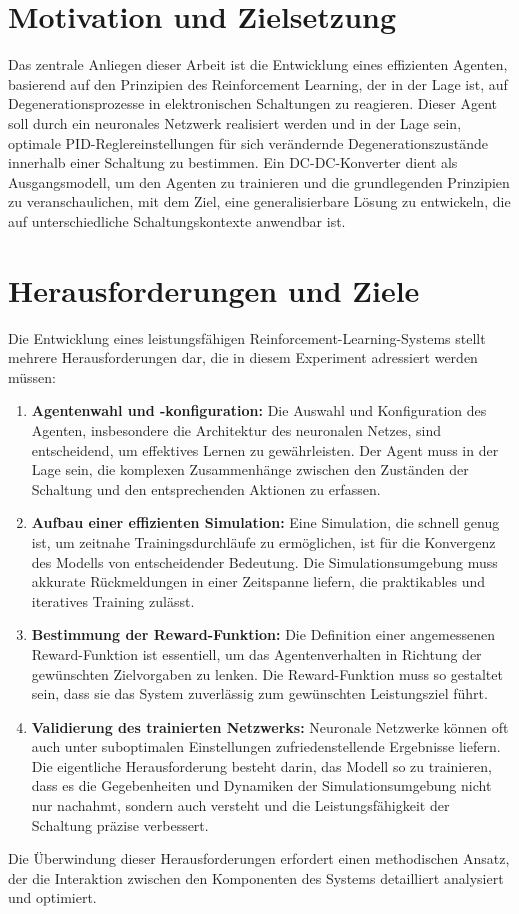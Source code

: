 \section{Motivation und Zielsetzung}

Das zentrale Anliegen dieser Arbeit ist die Entwicklung eines effizienten Agenten, basierend auf den Prinzipien des Reinforcement Learning, der in der Lage ist, auf Degenerationsprozesse in elektronischen Schaltungen zu reagieren. Dieser Agent soll durch ein neuronales Netzwerk realisiert werden und in der Lage sein, optimale PID-Reglereinstellungen für sich verändernde Degenerationszustände innerhalb einer Schaltung zu bestimmen. Ein DC-DC-Konverter dient als Ausgangsmodell, um den Agenten zu trainieren und die grundlegenden Prinzipien zu veranschaulichen, mit dem Ziel, eine generalisierbare Lösung zu entwickeln, die auf unterschiedliche Schaltungskontexte anwendbar ist.

\section{Herausforderungen und Ziele}

Die Entwicklung eines leistungsfähigen Reinforcement-Learning-Systems stellt mehrere Herausforderungen dar, die in diesem Experiment adressiert werden müssen:

\begin{enumerate}
    \item \textbf{Agentenwahl und -konfiguration:} Die Auswahl und Konfiguration des Agenten, insbesondere die Architektur des neuronalen Netzes, sind entscheidend, um effektives Lernen zu gewährleisten. Der Agent muss in der Lage sein, die komplexen Zusammenhänge zwischen den Zuständen der Schaltung und den entsprechenden Aktionen zu erfassen.
    
    \item \textbf{Aufbau einer effizienten Simulation:} Eine Simulation, die schnell genug ist, um zeitnahe Trainingsdurchläufe zu ermöglichen, ist für die Konvergenz des Modells von entscheidender Bedeutung. Die Simulationsumgebung muss akkurate Rückmeldungen in einer Zeitspanne liefern, die praktikables und iteratives Training zulässt.
    
    \item \textbf{Bestimmung der Reward-Funktion:} Die Definition einer angemessenen Reward-Funktion ist essentiell, um das Agentenverhalten in Richtung der gewünschten Zielvorgaben zu lenken. Die Reward-Funktion muss so gestaltet sein, dass sie das System zuverlässig zum gewünschten Leistungsziel führt.
    
    \item \textbf{Validierung des trainierten Netzwerks:} Neuronale Netzwerke können oft auch unter suboptimalen Einstellungen zufriedenstellende Ergebnisse liefern. Die eigentliche Herausforderung besteht darin, das Modell so zu trainieren, dass es die Gegebenheiten und Dynamiken der Simulationsumgebung nicht nur nachahmt, sondern auch versteht und die Leistungsfähigkeit der Schaltung präzise verbessert.
\end{enumerate}

Die Überwindung dieser Herausforderungen erfordert einen methodischen Ansatz, der die Interaktion zwischen den Komponenten des Systems detailliert analysiert und optimiert. 
